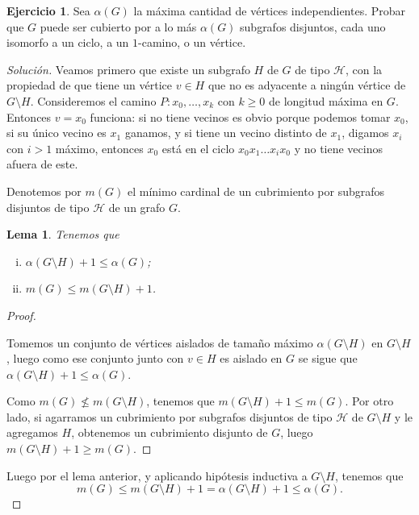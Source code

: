 \documentclass[12pt]{report}
\theoremstyle{plain}
\newtheorem{lemma}[theorem]{Lema}
\theoremstyle{definition}
\newtheorem{exercise}[theorem]{Ejercicio}
\newenvironment{solution}{\begin{proof}[Solución]}{\end{proof}}
\begin{document}
\begin{exercise}
Sea $\alpha (G)$ la máxima cantidad de vértices independientes. Probar que $G$ puede ser cubierto por a lo más $\alpha (G)$ subgrafos disjuntos, cada uno isomorfo a un ciclo, a un $1$-camino, o un vértice.
\end{exercise}
\begin{solution}
Veamos primero que existe un subgrafo $H$ de $G$ de tipo $\mathcal H$, con la propiedad de que tiene un vértice $v\in H$ que no es adyacente a ningún vértice de $G \setminus H$. Consideremos el camino $P : x_0, \ldots, x_k$ con $k\geq 0$ de longitud máxima en $G$. Entonces $v = x_0$ funciona: si no tiene vecinos es obvio porque podemos tomar $x_0$, si su único vecino es $x_1$ ganamos, y si tiene un vecino distinto de $x_1$, digamos $x_i$ con $i > 1$ máximo, entonces $x_0$ está en el ciclo $x_0 x_1 \ldots x_i x_0$ y no tiene vecinos afuera de este.

Denotemos por $m(G)$ el mínimo cardinal de un cubrimiento por subgrafos disjuntos de tipo $\mathcal H$ de un grafo $G$.

\begin{lemma}
Tenemos que \begin{enumerate}[(i)]
\item $\alpha (G\setminus H) + 1 \leq \alpha (G)$;
\item $m(G) \leq m(G\setminus H) + 1$.
\end{enumerate}
\end{lemma}
\begin{proof}
\begin{enumerate}[(i)]
\end{enumerate}
\item Tomemos un conjunto de vértices aislados de tamaño máximo $\alpha (G \setminus H)$ en $G \setminus H$, luego como ese conjunto junto con $v \in H$ es aislado en $G$ se sigue que $\alpha (G \setminus H) + 1 \leq \alpha (G)$.

\item Como $m(G) \not \leq m(G \setminus H)$, tenemos que $m(G\setminus H) +1 \leq m(G)$. Por otro lado, si agarramos un cubrimiento por subgrafos disjuntos de tipo $\mathcal H$ de $G \setminus H$ y le agregamos $H$, obtenemos un cubrimiento disjunto de $G$, luego $m(G\setminus H) + 1 \geq m(G)$.
\end{proof}

Luego por el lema anterior, y aplicando hipótesis inductiva a $G \setminus H$, tenemos que
\[
    m(G) \leq m(G\setminus H) + 1 = \alpha (G\setminus H) + 1 \leq \alpha (G).
\]
\end{solution}
\end{document}
